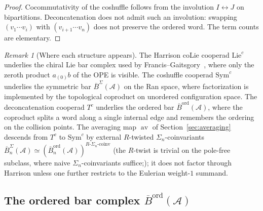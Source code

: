 \documentclass[11pt,reqno]{amsart}
\theoremstyle{definition}
\theoremstyle{remark}
\newtheorem{remark}[theorem]{Remark}
\newcommand{\cA}{\mathcal{A}}
\newcommand{\Sym}{\mathrm{Sym}}
\newcommand{\Lie}{\mathrm{Lie}}
\DeclareMathOperator{\av}{av}
\newcommand{\Barord}{\overline{B}^{\mathrm{ord}}}
\newcommand{\BarSig}{\overline{B}^{\Sigma}}
\numberwithin{equation}{section}
\begin{document}
\begin{proof}
Cocommutativity of the coshuffle follows from the involution
$I \leftrightarrow J$ on bipartitions. Deconcatenation does not
admit such an involution: swapping $(v_1 \cdots v_i)$ with
$(v_{i+1} \cdots v_n)$ does not preserve the ordered word.
The term counts are elementary.
\end{proof}

\begin{remark}[Where each structure appears]
\label{rem:where-coalgebras}
The Harrison coLie cooperad $\Lie^c$ underlies the chiral Lie bar
complex used by Francis--Gaitsgory~\cite{FG12}, where only the
zeroth product $a_{(0)}b$ of the OPE is visible. The coshuffle
cooperad $\Sym^c$ underlies the symmetric bar $\BarSig(\cA)$ on
the Ran space, where factorization is implemented by the topological
coproduct on unordered configuration space. The deconcatenation
cooperad $T^c$ underlies the ordered bar $\Barord(\cA)$, where
the coproduct splits a word along a single internal edge and
remembers the ordering on the collision points. The averaging map
$\av$ of Section~\ref{sec:averaging} descends from $T^c$ to
$\Sym^c$ by external $R$-twisted $\Sigma_n$-coinvariants
$\BarSig_n(\cA) \simeq (\Barord_n(\cA))^{R\text{-}\Sigma_n\text{-coinv}}$
(the $R$-twist is trivial on the pole-free subclass, where naive
$\Sigma_n$-coinvariants suffice;); it does not factor
through Harrison unless one further restricts to the Eulerian
weight-$1$ summand.
\end{remark}

\subsection{The ordered bar complex $\Barord(\cA)$}
\end{document}
